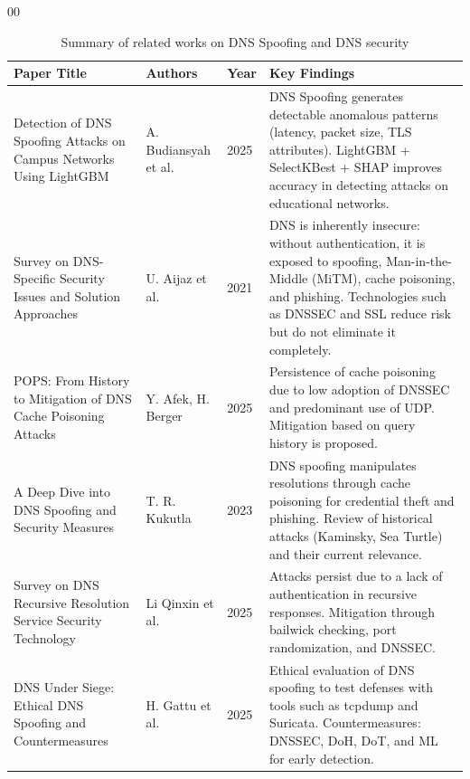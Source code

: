 \documentclass[conference]{IEEEtran}
\begin{document}
\begin{thebibliography}{00}

\begin{table}[htbp]
\caption{Summary of related works on DNS Spoofing and DNS security}
\label{tab:table1}
\begin{tabular}{@{}p{4cm} p{2.5cm} p{1cm} p{9.2cm}@{}} \hline
\textbf{Paper Title} & \textbf{Authors} & \textbf{Year} & \textbf{Key Findings} \\ \hline

Detection of DNS Spoofing Attacks on Campus Networks Using LightGBM
& A. Budiansyah et al.
& 2025
& DNS Spoofing generates detectable anomalous patterns (latency, packet size, TLS attributes). LightGBM + SelectKBest + SHAP improves accuracy in detecting attacks on educational networks. \\

Survey on DNS-Specific Security Issues and Solution Approaches
& U. Aijaz et al.
& 2021
& DNS is inherently insecure: without authentication, it is exposed to spoofing, Man-in-the-Middle (MiTM), cache poisoning, and phishing. Technologies such as DNSSEC and SSL reduce risk but do not eliminate it completely. \\

POPS: From History to Mitigation of DNS Cache Poisoning Attacks
& Y. Afek, H. Berger
& 2025
& Persistence of cache poisoning due to low adoption of DNSSEC and predominant use of UDP. Mitigation based on query history is proposed. \\

A Deep Dive into DNS Spoofing and Security Measures
& T. R. Kukutla
& 2023
& DNS spoofing manipulates resolutions through cache poisoning for credential theft and phishing. Review of historical attacks (Kaminsky, Sea Turtle) and their current relevance. \\

Survey on DNS Recursive Resolution Service Security Technology
& Li Qinxin et al.

& 2025
& Attacks persist due to a lack of authentication in recursive responses. Mitigation through bailwick checking, port randomization, and DNSSEC. \\

DNS Under Siege: Ethical DNS Spoofing and Countermeasures
& H. Gattu et al.

& 2025
& Ethical evaluation of DNS spoofing to test defenses with tools such as tcpdump and Suricata. Countermeasures: DNSSEC, DoH, DoT, and ML for early detection. \\


\end{tabular}
\end{table}
\end{thebibliography}
\end{document}
